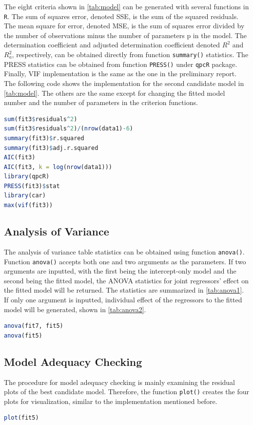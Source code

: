 \documentclass[11pt]{article}
\begin{document}
The eight criteria shown in \autoref{tab:model} can be generated with several functions in \texttt{R}. The sum of squares error, denoted SSE, is the sum of the squared residuals. The mean square for error, denoted MSE, is the sum of squares error divided by the number of observations minus the number of parameters p in the model. The determination coefficient and adjusted determination coefficient denoted $R^2$ and $R_a^2$, respectively, can be obtained directly from function \texttt{summary()} statistics. The PRESS statistics can be obtained from function \texttt{PRESS()} under \texttt{qpcR} package. Finally, VIF implementation is the same as the one in the preliminary report. The following code shows the implementation for the second candidate model in \autoref{tab:model}. The others are the same except for changing the fitted model number and the number of parameters in the criterion functions.

\begin{file}[project.r]
\begin{lstlisting}[language = R]
sum(fit3$residuals^2)
sum(fit3$residuals^2)/(nrow(data1)-6)
summary(fit3)$r.squared
summary(fit3)$adj.r.squared
AIC(fit3)
AIC(fit3, k = log(nrow(data1)))
library(qpcR)
PRESS(fit3)$stat
library(car)
max(vif(fit3))
\end{lstlisting}
\end{file}

\subsection{Analysis of Variance}
The analysis of variance table statistics can be obtained using function \texttt{anova()}. Function \texttt{anova()} accepts both one and two arguments as the parameters. If two arguments are inputted, with the first being the intercept-only model and the second being the fitted model, the ANOVA statistics for joint regressors' effect on the fitted model will be returned. The statistics are summarized in \autoref{tab:anova1}. If only one argument is inputted, individual effect of the regressors to the fitted model will be generated, shown in \autoref{tab:anova2}.

\begin{file}[project.r]
\begin{lstlisting}[language = R]
anova(fit7, fit5)
anova(fit5)
\end{lstlisting}
\end{file}

\subsection{Model Adequacy Checking}
The procedure for model adequacy checking is mainly examining the residual plots of the best candidate model. Therefore, the function \texttt{plot()} creates the four plots for visualization, similar to the implementation mentioned before.
\begin{file}[project.r]
\begin{lstlisting}[language = R]
plot(fit5)
\end{lstlisting}
\end{file}
\end{document}
